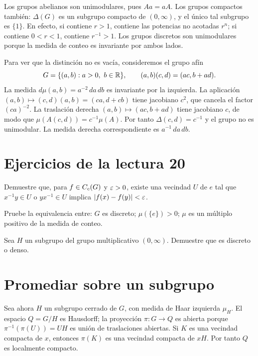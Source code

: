 \begin{ejemplo}\label{v4:mod-ejemplos}
Los grupos abelianos son unimodulares, pues $Aa=aA$. Los grupos compactos también: $\Delta(G)$ es un subgrupo compacto de $(0,\infty)$, y el único tal subgrupo es $\{1\}$. En efecto, si contiene $r>1$, contiene las potencias no acotadas $r^n$; si contiene $0<r<1$, contiene $r^{-1}>1$. Los grupos discretos son unimodulares porque la medida de conteo es invariante por ambos lados.

Para ver que la distinción no es vacía, consideremos el grupo afín
\[
 G=\{(a,b):a>0,\ b\in\mathbb R\},\qquad
 (a,b)(c,d)=(ac,b+ad).
\]
La medida $d\mu(a,b)=a^{-2}\,da\,db$ es invariante por la izquierda. La aplicación $(a,b)\mapsto(c,d)(a,b)=(ca,d+cb)$ tiene jacobiano $c^2$, que cancela el factor $(ca)^{-2}$. La traslación derecha $(a,b)\mapsto(ac,b+ad)$ tiene jacobiano $c$, de modo que
$\mu(A(c,d))=c^{-1}\mu(A)$. Por tanto $\Delta(c,d)=c^{-1}$ y el grupo no es unimodular. La medida derecha correspondiente es $a^{-1}\,da\,db$.
\end{ejemplo}

\section{Ejercicios de la lectura 20}
\begin{ejercicio}\label{ej:v4-l20-1}
Demuestre que, para $f\in C_c(G)$ y $\varepsilon>0$, existe una vecindad $U$ de $e$ tal que $x^{-1}y\in U$ o $yx^{-1}\in U$ implica $|f(x)-f(y)|<\varepsilon$.
\end{ejercicio}


\begin{ejercicio}\label{ej:v4-l20-2}
Pruebe la equivalencia entre: $G$ es discreto; $\mu(\{e\})>0$; $\mu$ es un múltiplo positivo de la medida de conteo.
\end{ejercicio}


\begin{ejercicio}\label{ej:v4-l20-3}
Sea $H$ un subgrupo del grupo multiplicativo $(0,\infty)$. Demuestre que es discreto o denso.
\end{ejercicio}


\section{Promediar sobre un subgrupo}\label{lectura:v4-21}
Sea ahora $H$ un subgrupo cerrado de $G$, con medida de Haar izquierda $\mu_H$. El espacio $Q=G/H$ es Hausdorff; la proyección $\pi:G\to Q$ es abierta porque $\pi^{-1}(\pi(U))=UH$ es unión de traslaciones abiertas. Si $K$ es una vecindad compacta de $x$, entonces $\pi(K)$ es una vecindad compacta de $xH$. Por tanto $Q$ es localmente compacto.

